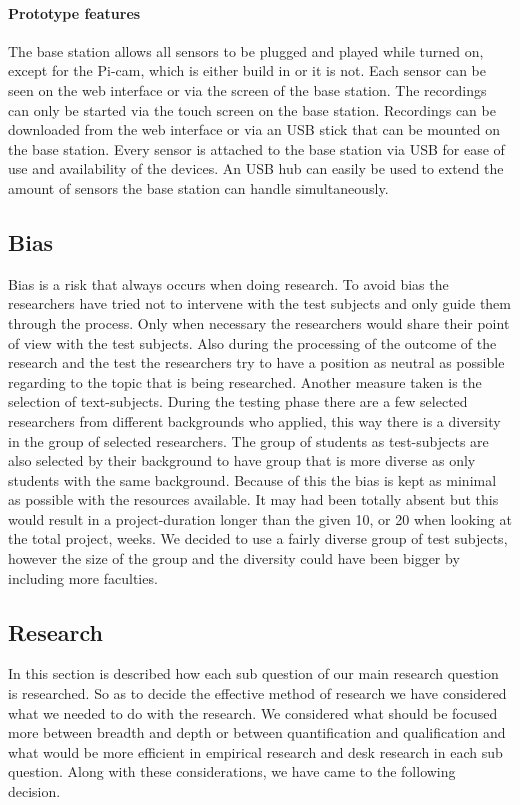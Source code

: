 \documentclass[conference]{IEEEtran}
\begin{document}
			\paragraph{Prototype features}
				The base station allows all sensors to be plugged and played while turned on, except for the Pi-cam, which is either build in or it is not. Each sensor can be seen on the web interface or via the screen of the base station. The recordings can only be started via the touch screen on the base station. Recordings can be downloaded from the web interface or via an USB stick that can be mounted on the base station. Every sensor is attached to the base station via USB for ease of use and availability of the devices. An USB hub can easily be used to extend the amount of sensors the base station can handle simultaneously. 
		\subsection{Bias}
			Bias is a risk that always occurs when doing research. To avoid bias the researchers have tried not to intervene with the test subjects and only guide them through the process. Only when necessary the researchers would share their point of view with the test subjects. Also during the processing of the outcome of the research and the test the researchers try to have a position as neutral as possible regarding to the topic that is being researched. Another measure taken is the selection of text-subjects. During the testing phase there are a few selected researchers from different backgrounds who applied, this way there is a diversity in the group of selected researchers. The group of students as test-subjects are also selected by their background to have group that is more diverse as only students with the same background. Because of this the bias is kept as minimal as possible with the resources available. It may had been totally absent but this would result in a project-duration longer than the given 10, or 20 when looking at the total project, weeks. We decided to use a fairly diverse group of test subjects, however the size of the group and the diversity could have been bigger by including more faculties.
		\subsection{Research}
			In this section is described how each sub question of our main research question is researched. So as to decide the effective method of research we have considered what we needed to do with the research. We considered what should be focused more between breadth and depth or between quantification and qualification and what would be more efficient in empirical research and desk research in each sub question. Along with these considerations, we have came to the following decision. 
\end{document}
